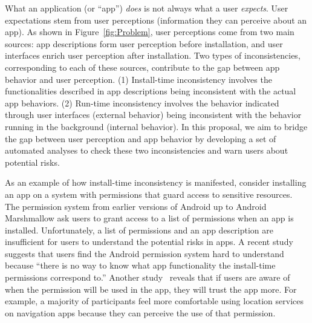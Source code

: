 What an application (or ``app'') \emph{does} is not always what a user
\emph{expects}.
User expectations stem from user perceptions (information they can perceive about an app).
As shown in Figure~\ref{fig:Problem}, user perceptions come from two main sources:
app descriptions form user perception before installation, and user interfaces
enrich user perception after installation.
Two types of inconsistencies, corresponding to each of these sources, contribute
to the gap between app behavior and user perception.
(1) Install-time inconsistency involves the functionalities described in app
descriptions being inconsistent with the actual app behaviors.
(2) Run-time inconsistency involves the behavior indicated through user
interfaces (external behavior) being inconsistent with the behavior running in
the background (internal behavior).
In this proposal, we aim to bridge the gap between user perception and app
behavior by developing a set of automated analyses to check these two
inconsistencies and warn users about potential risks.

As an example of how install-time inconsistency is manifested, consider
installing an app on a system with permissions that guard access to
sensitive resources.
The permission system from earlier versions of Android up to Android Marshmallow
ask users to grant access to a list of permissions when an app is installed.
Unfortunately, a list of permissions and an app description are
insufficient for users to understand the potential risks in apps.
A recent study~\cite{felt2012android} suggests that users find the Android
permission system hard to understand because ``there is no way to know what app
functionality the install-time permissions correspond to.''
Another study~\cite{chin2012measuring} reveals that if users are aware of when
the permission will be used in the app, they will trust the app more. For
example, a majority of participants feel more comfortable using location
services on navigation apps because they can perceive the use of that permission.

